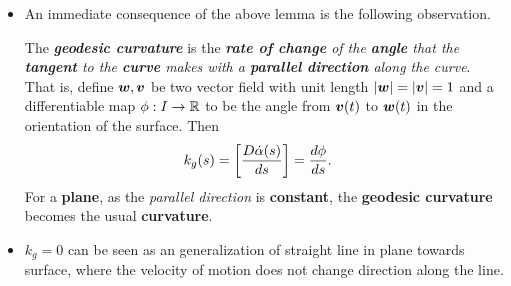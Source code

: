 \documentclass[11pt]{article}
\begin{document}
\begin{itemize}
\begin{proof}
It then follows that 
\begin{align*}
\brac{\frac{D\mb{w}}{dt}} &= \inn{\mb{w}' }{\hat{\mb{w}}} =  \phi' + \inn{\mb{v}'}{\hat{\mb{v}}} = \frac{d\phi}{dt} + \brac{\frac{D\mb{v}}{dt}},
\end{align*}
since 
\begin{align*}
 \inn{\mb{w}' }{\hat{\mb{w}}}  &= \inn{\frac{d\mb{w}}{dt}}{\mb{N}\wedge\mb{w}} = \brac{\frac{D\mb{w}}{dt}}\norm{\mb{N}\wedge\mb{w}}{}^{2} =  \brac{\frac{D\mb{w}}{dt}}.
\end{align*}\QEDA
\end{proof}


\item An immediate consequence of the above lemma is the following observation. 

The \emph{\textbf{geodesic curvature}} is the \emph{\textbf{rate of change} of the \textbf{angle} that the \textbf{tangent} to the \textbf{curve} makes with a \textbf{parallel direction} along the curve}. That is, define $\boldsymbol{w}, \boldsymbol{v}$ be two vector field with unit length $\left\lvert \boldsymbol{w} \right\rvert = \left\lvert \boldsymbol{v} \right\rvert = 1$ and a differentiable map $\phi: I \rightarrow {\mathbb R}$ to be the angle from $\boldsymbol{v}(t)$ to $\boldsymbol{w}(t)$ in the orientation of the surface. Then 
\begin{align*}
k_{g}(s) &= \left[\frac{D\dot{\alpha}(s)}{ds}\right] = \frac{d\phi}{ds}.
\end{align*}
For a \textbf{plane}, as the \emph{parallel direction} is \textbf{constant}, the \textbf{geodesic curvature} becomes the usual \textbf{curvature}.

\item $k_g = 0$ can be seen as an generalization of straight line in plane towards surface, where the velocity of motion does not change direction along the line.


\end{itemize}
\end{document}
